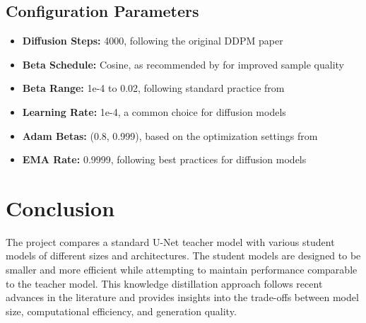 \documentclass{article}
\begin{document}
\subsection{Configuration Parameters}
\begin{itemize}
  \item \textbf{Diffusion Steps:} 4000, following the original DDPM paper \citep{ho2020denoising}
  \item \textbf{Beta Schedule:} Cosine, as recommended by \citet{nichol2021improved} for improved sample quality
  \item \textbf{Beta Range:} 1e-4 to 0.02, following standard practice from \citet{ho2020denoising}
  \item \textbf{Learning Rate:} 1e-4, a common choice for diffusion models \citep{ho2020denoising, nichol2021improved}
  \item \textbf{Adam Betas:} (0.8, 0.999), based on the optimization settings from \citet{nichol2021improved}
  \item \textbf{EMA Rate:} 0.9999, following best practices for diffusion models \citep{song2020score, nichol2021improved}
\end{itemize}

\section{Conclusion}

The project compares a standard U-Net teacher model with various student models of different sizes and architectures. The student models are designed to be smaller and more efficient while attempting to maintain performance comparable to the teacher model. This knowledge distillation approach follows recent advances in the literature \citep{salimans2022progressive, song2023consistency} and provides insights into the trade-offs between model size, computational efficiency, and generation quality.



\end{document}
